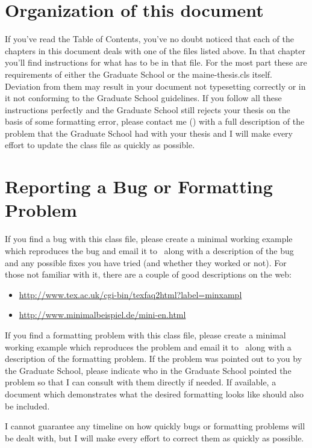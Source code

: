 \section{Organization of this document}
If you've read the Table of Contents, you've no doubt noticed that each of the chapters in this document deals with one of the files listed above.  In that chapter you'll find instructions for what has to be in that file.  For the most part these are requirements of either the Graduate School or the maine-thesis.cls itself.  Deviation from them may result in your document not typesetting correctly or in it not conforming to the Graduate School guidelines.  If you follow all these instructions perfectly and the Graduate School still rejects your thesis on the basis of some formatting error, please contact me (\email) with a full description of the problem that the Graduate School had with your thesis and I will make every effort to update the class file as quickly as possible.

\section{Reporting a Bug or Formatting Problem}
If you find a bug with this class file, please create a minimal working example which reproduces the bug and email it to \email\ along with a description of the bug and any possible fixes you have tried (and whether they worked or not).  For those not familiar with it, there are a couple of good descriptions on the web:
\begin{itemize}
\item{\url{http://www.tex.ac.uk/cgi-bin/texfaq2html?label=minxampl}}
\item{\url{http://www.minimalbeispiel.de/mini-en.html}}
\end{itemize}

If you find a formatting problem with this class file, please create a minimal working example which reproduces the problem and email it to \email\ along with a description of the formatting problem.  If the problem was pointed out to you by the Graduate School, please indicate who in the Graduate School pointed the problem so that I can consult with them directly if needed.  If available, a document which demonstrates what the desired formatting looks like should also be included.

I cannot guarantee any timeline on how quickly bugs or formatting problems will be dealt with, but I will make every effort to correct them as quickly as possible.

\endinput